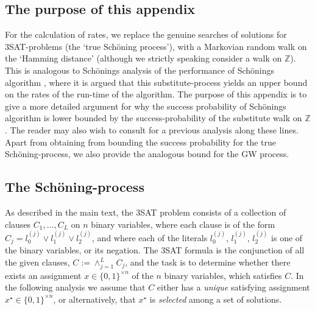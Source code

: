 \documentclass[a4paper,aps,floatfix]{revtex4}
\begin{document}
\subsection{The purpose of this appendix}

For the calculation of rates, we replace the genuine searches of solutions for 3SAT-problems (the `true  Sch\"oning process'), with a Markovian random walk on  the `Hamming distance' (although we strictly speaking consider a walk on $\mathbb{Z}$). This is analogous to Sch\"onings analysis of the performance of Sch\"onings algorithm \cite{Schoening99,SchoeningToranBook}, where it is argued that this substitute-process yields an upper bound on the rates of the run-time of the algorithm. The purpose of this appendix is to give a more detailed argument for why the success probability of Sch\"onings algorithm is lower bounded by the success-probability of the substitute walk on $\mathbb{Z}$. The reader may also wish to consult \cite{SwissPhDThesis} for a previous analysis along these lines. Apart from obtaining from bounding the success probability for the true Sch\"oning-process, we also provide the analogous bound for the GW process.







\subsection{The Sch\"oning-process}

As described in the main text, the 3SAT problem consists of  a collection of clauses $C_1,\ldots, C_L$ on $n$ binary variables, where each clause is of the form $C_j = l_0^{(j)}\vee l_1^{(j)}\vee l_2^{(j)}$, and where each of the literals $l_0^{(j)}$,  $l_1^{(j)}$, $l_2^{(j)}$ is one of the binary variables, or its negation.   The  3SAT formula is the conjunction of all the given clauses, $C := \wedge_{j=1}^{L}C_j$, and the task is to determine whether there exists an assignment $x\in \{0,1\}^{\times n}$ of the $n$ binary variables, which satisfies $C$.  In the following analysis we assume that $C$ either has a \emph{unique} satisfying assignment $x^{\star}\in \{0,1\}^{\times n}$, or alternatively, that $x^{\star}$ is \emph{selected} among a set of solutions.
\end{document}
